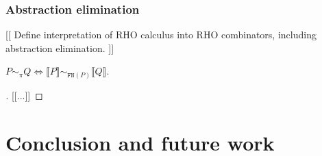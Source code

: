 \documentclass[a4paper,UKenglish]{lipics-v2016}
\newcommand{\interp}[1]{\llbracket #1 \rrbracket}
\begin{document}
\subsubsection{Abstraction elimination}
[[ Define interpretation of RHO calculus into RHO combinators, including abstraction elimination. ]]

\begin{theorem}
  $P \sim_{\pi} Q \iff  \interp{P} \sim_{\texttt{FN}(P)} \interp{Q}$.
\end{theorem}

\begin{proof}[]
  [[...]]
\end{proof}
\section{Conclusion and future work}



\end{document}
